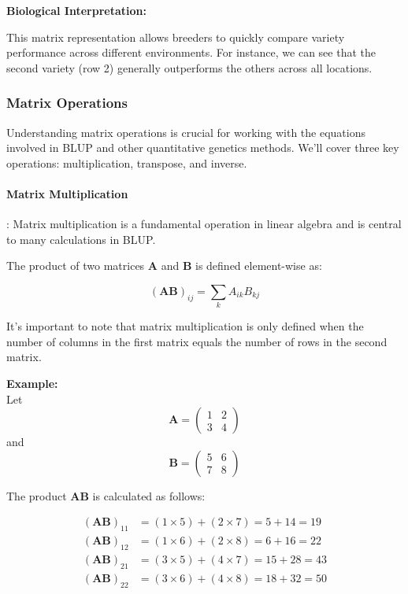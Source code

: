 \documentclass[12pt,a4paper]{article}
\newenvironment{interpretation}[1][]
{\begin{basebox}[linecolor=uqgreen]
\textbf{\color{uqgreen}Biological Interpretation:} \textit{#1}\par\noindent\ignorespaces}
{\end{basebox}}
\newenvironment{greenbox}[1][]
{\begin{basebox}[linecolor=uqgreen]
\textbf{\color{uqgreen}#1}\par\noindent\ignorespaces}
{\end{basebox}}
\begin{document}
\begin{interpretation}
This matrix representation allows breeders to quickly compare variety performance across different environments. For instance, we can see that the second variety (row 2) generally outperforms the others across all locations.
\end{interpretation}


\subsubsection{Matrix Operations}

Understanding matrix operations is crucial for working with the equations involved in BLUP and other quantitative genetics methods. We'll cover three key operations: multiplication, transpose, and inverse.

\paragraph{Matrix Multiplication}: Matrix multiplication is a fundamental operation in linear algebra and is central to many calculations in BLUP. 

\begin{greenbox}
The product of two matrices $\mathbf{A}$ and $\mathbf{B}$ is defined element-wise as:

$$(\mathbf{AB})_{ij} = \sum_k A_{ik}B_{kj}$$

\end{greenbox}

It's important to note that matrix multiplication is only defined when the number of columns in the first matrix equals the number of rows in the second matrix.

\textbf{Example:}\\
Let $$\mathbf{A} = \begin{pmatrix} 1 & 2 \\ 3 & 4 \end{pmatrix}$$ and $$\mathbf{B} = \begin{pmatrix} 5 & 6 \\ 7 & 8 \end{pmatrix}$$

The product $\mathbf{AB}$ is calculated as follows:

\begin{align*}
(\mathbf{AB})_{11} &= (1 \times 5) + (2 \times 7) = 5 + 14 = 19 \\
(\mathbf{AB})_{12} &= (1 \times 6) + (2 \times 8) = 6 + 16 = 22 \\
(\mathbf{AB})_{21} &= (3 \times 5) + (4 \times 7) = 15 + 28 = 43 \\
(\mathbf{AB})_{22} &= (3 \times 6) + (4 \times 8) = 18 + 32 = 50
\end{align*}
\end{document}
